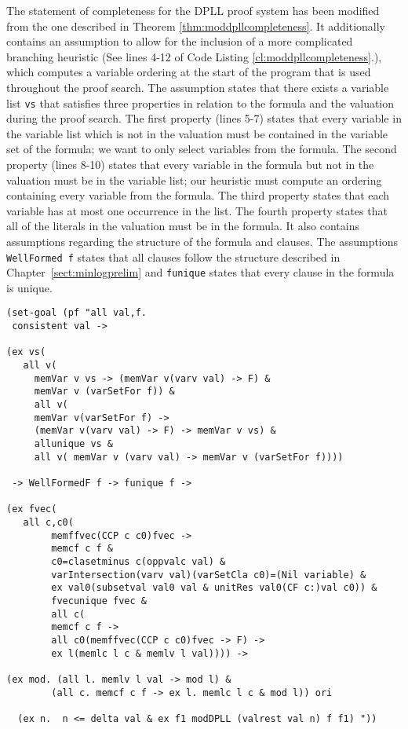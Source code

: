 The statement of completeness for the DPLL proof system has been modified from the one described in Theorem \ref{thm:moddpllcompleteness}. It additionally contains an assumption to allow for the inclusion of a more complicated branching heuristic (See lines 4-12 of Code Listing \ref{cl:moddpllcompleteness}.), which computes a variable ordering at the start of the program that is used throughout the proof search.  The assumption states that there exists a variable list \texttt{vs} that satisfies three properties in relation to the formula and the valuation during the proof search.  The first property (lines 5-7) states that every variable in the variable list which is not in the valuation must be contained in the variable set of the formula; we want to only select variables from the formula. The second property (lines 8-10) states that every variable in the formula but  not in the valuation must be in the variable list; our heuristic must compute an ordering containing every variable from the formula. The third property states that each variable has at most one occurrence in the list. The fourth property states that all of the literals in the valuation must be in the formula. It also contains assumptions regarding the structure of the formula and clauses. The assumptions  \texttt{WellFormed f} states that all clauses follow the structure described in Chapter~\ref{sect:minlogprelim} and \texttt{funique} states that every clause in the formula is unique.

\begin{lstlisting}[caption = The Completeness Theorem for the Modified DPLL Proof System in Minlog, label = cl:moddpllcompleteness]
(set-goal (pf "all val,f.  
 consistent val -> 
 
(ex vs(
   all v(
     memVar v vs -> (memVar v(varv val) -> F) & 
     memVar v (varSetFor f)) & 
     all v(
     memVar v(varSetFor f) -> 
     (memVar v(varv val) -> F) -> memVar v vs) & 
     allunique vs & 
     all v( memVar v (varv val) -> memVar v (varSetFor f))))
    
 -> WellFormedF f -> funique f ->

(ex fvec(
   all c,c0(
        memffvec(CCP c c0)fvec -> 
        memcf c f & 
        c0=clasetminus c(oppvalc val) & 
        varIntersection(varv val)(varSetCla c0)=(Nil variable) & 
        ex val0(subsetval val0 val & unitRes val0(CF c:)val c0)) & 
        fvecunique fvec &
        all c(
        memcf c f -> 
        all c0(memffvec(CCP c c0)fvec -> F) -> 
        ex l(memlc l c & memlv l val)))) ->

(ex mod. (all l. memlv l val -> mod l) & 
        (all c. memcf c f -> ex l. memlc l c & mod l)) ori 

  (ex n.  n <= delta val & ex f1 modDPLL (valrest val n) f f1) "))
\end{lstlisting}


